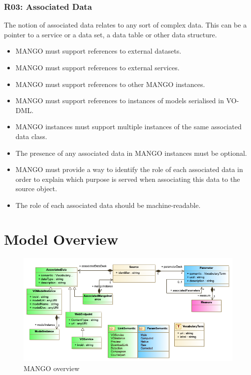 \documentclass[11pt,a4paper]{ivoa}
\begin{document}
\subsubsection{R03: Associated Data}
The notion of associated data relates to any sort of complex data. This can be a pointer to a service or a data set, a data table or  other data structure.
\begin{itemize}
    \item MANGO must support references to external datasets.
    \item MANGO must support references to external services.
    \item MANGO must support references to other MANGO instances.
    \item MANGO  must support references to instances of models serialised in VO-DML.
    \item MANGO instances must support multiple instances of the same associated data class.
    \item The presence of any associated data in MANGO instances must be optional.
    \item MANGO must provide a way to identify the role of each associated data in order to explain which purpose is served when associating this data to the source object.
    \item The role of each associated data should be machine-readable.
 \end{itemize}

\section{Model Overview}

\begin{figure}
\includegraphics[width=1.0\textwidth]{../model/mangoOverview.png}
\caption{MANGO overview}
\label{fig:overview}
\end{figure}
\end{document}
